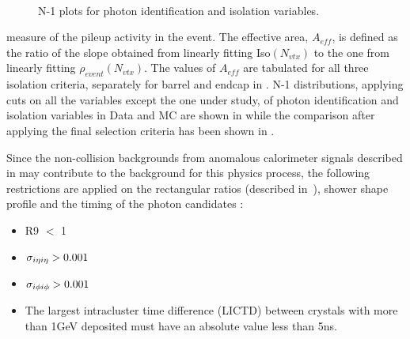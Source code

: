 \begin{figure}[h!]
   \\
 \caption{N-1 plots for photon identification and isolation variables.}
\label{fig:photonIsolation_N-1}
\end{figure}
measure of the pileup activity in the event. The effective area, $A_{eff}$, is defined as the ratio of the slope obtained from linearly fitting 
Iso$(N_{vtx})$ to the one from linearly fitting $\rho_{event}(N_{vtx})$. The values of $A_{eff}$ are tabulated for all three isolation criteria,
 separately for barrel and endcap in \tab{\ref{Table:photonAeff}}. N-1 distributions, \ie applying cuts on all the variables except the one under 
study, of photon identification and isolation variables in Data and MC are shown in \fig{\ref{fig:photonIsolation_N-1}} while the comparison after 
applying the final selection criteria has been shown in \fig{\ref{fig:photonIsolation}}.

Since the non-collision backgrounds from anomalous calorimeter signals described in \sectn{\ref{Se:Spikes}} may contribute to the background for
this physics process, the following restrictions are applied on the rectangular ratios (described in~\sectn{\ref{section:ShowerShapeVariables}}), 
shower shape profile and the timing of the photon candidates :
\begin{itemize}
\item R9 $<$ 1
\item $\sigma_{i{\eta}i{\eta}} > 0.001$
\item $\sigma_{i{\phi}i{\phi}} > 0.001$
\item The largest intracluster time difference (\gls{LICTD}) between crystals with more than 1\unit{GeV} deposited must have an absolute value less 
than 5\unit{ns}.
\end{itemize}

